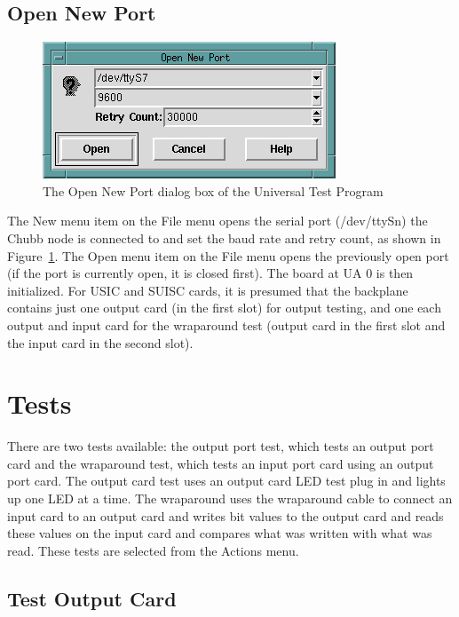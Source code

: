 \subsection{Open New Port}
\begin{figure}[hbpt]
\begin{centering}
\includegraphics{UTNewCard.png}
\caption{The Open New Port dialog box of the Universal Test Program}
\label{fig:ut:new}
\end{centering}
\end{figure}
The New menu item on the File menu opens the serial port (/dev/ttySn)
the Chubb node is connected to and set the baud rate and retry count,
as shown in Figure~\ref{fig:ut:new}. The Open menu item on the File
menu opens the previously open port (if the port is currently open, it
is closed first).  The board at UA 0 is then initialized.  For USIC and
SUISC cards, it is presumed that the backplane contains just one output
card (in the first slot) for output testing, and one each output and
input card for the wraparound test (output card in the first slot and
the input card in the second slot).

\section{Tests}

There are two tests available: the output port test, which tests an output
port card and the wraparound test, which tests an input port card using
an output port card.  The output card test uses an output card LED test
plug in and lights up one LED at a time.  The wraparound uses the
wraparound cable to connect an input card to an output card and writes
bit values to the output card and reads these values on the input card
and compares what was written with what was read. These tests are
selected from the Actions menu.  

\subsection{Test Output Card}

